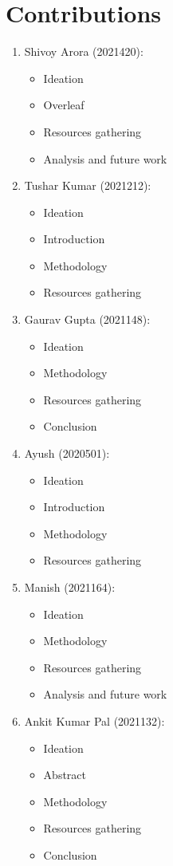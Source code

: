 \documentclass[acmtog]{acmart}
\begin{document}
\cleardoublepage
\section*{Contributions}
\begin{enumerate}
    \item Shivoy Arora (2021420):
    \begin{itemize}
        \item Ideation
        \item Overleaf
        \item Resources gathering
        \item Analysis and future work
    \end{itemize}

    \item Tushar Kumar (2021212):
    \begin{itemize}
        \item Ideation
        \item Introduction
        \item Methodology
        \item Resources gathering
    \end{itemize}

    \item Gaurav Gupta (2021148):
    \begin{itemize}
        \item Ideation
        \item Methodology
        \item Resources gathering
        \item Conclusion
    \end{itemize}

    \item Ayush (2020501):
    \begin{itemize}
        \item Ideation
        \item Introduction
        \item Methodology
        \item Resources gathering
    \end{itemize}

    \item Manish (2021164):
    \begin{itemize}
        \item Ideation
        \item Methodology
        \item Resources gathering
        \item Analysis and future work
    \end{itemize}

    \item Ankit Kumar Pal (2021132):
    \begin{itemize}
        \item Ideation
        \item Abstract
        \item Methodology
        \item Resources gathering
        \item Conclusion
    \end{itemize}
\end{enumerate}
\end{document}
